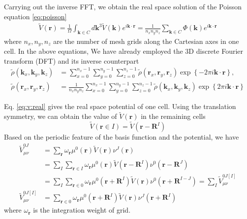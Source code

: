 \documentclass{article}
\begin{document}
Carrying out the inverse FFT, we obtain the real space solution of the Poisson
equation \eqref{eq:poisson}
\begin{align}
  \tilde{V}(\mathbf{r})
  =\frac{1}{\Omega}\int_{\mathbf{k}\in C} d\mathbf{k}^3
  \tilde{V}(\mathbf{k}) e^{i\mathbf{k}\cdot\mathbf{r}}
  =\frac{1}{n_xn_yn_z}\sum_{\mathbf{k}\in C}
  \Phi(\mathbf{k}) e^{i\mathbf{k}\cdot \mathbf{r}}
  \label{eq:v:real}
\end{align}
where $n_x,n_y,n_z$ are the number of mesh grids along the Cartesian axes in
one cell.
In the above equations, We have already employed the 3D discrete Fourier
transform (DFT) and its inverse counterpart 
\begin{align}
  \tilde{\rho}(\mathbf{k}_x,\mathbf{k}_y,\mathbf{k}_z)
  &=\sum_{x=0}^{n_x-1} \sum_{y=0}^{n_y-1} \sum_{z=0}^{n_z-1}
  \tilde{\rho}(\mathbf{r}_x,\mathbf{r}_y,\mathbf{r}_z)
  \exp\left\{-2\pi i \mathbf{k}\cdot\mathbf{r}\right\},
  \\
  \tilde{\rho}(\mathbf{r}_x,\mathbf{r}_y,\mathbf{r}_z)
  &=\frac{1}{n_xn_yn_z}\sum_{x=0}^{n_x-1}
  \sum_{y=0}^{n_y-1} \sum_{z=0}^{n_z-1}
  \tilde{\rho}(\mathbf{k}_x,\mathbf{k}_y,\mathbf{k}_z)
  \exp\left\{2\pi i \mathbf{k}\cdot \mathbf{r}\right\}
  \label{}
\end{align}

Eq. \eqref{eq:v:real} gives the real space potential of one cell.
Using the translation symmetry, we can obtain the value of
$\tilde{V}(\mathbf{r})$ in the remaining cells
\begin{equation}
  \tilde{V}(\mathbf{r}\in I) = \tilde{V}(\mathbf{r}-\mathbf{R}^I)
  \label{}
\end{equation}
Based on the periodic feature of the basis function and the potential, we
have
\begin{align}
  \tilde{V}_{\mu\nu}^{0J}
  &=\sum_{\mathbf{r}} \omega_\mathbf{r}
  \mu^0(\mathbf{r})\tilde{V}(\mathbf{r})\nu^J(\mathbf{r})
  \\
  &=\sum_{I}\sum_{\mathbf{r}\in I} \omega_\mathbf{r} \mu^0(\mathbf{r})
  \tilde{V}(\mathbf{r} - \mathbf{R}^I)\nu^0(\mathbf{r}-\mathbf{R}^J)
  \\
  &=\sum_{I}\sum_{\mathbf{r}\in 0} \omega_\mathbf{r}
  \mu^0(\mathbf{r}+\mathbf{R}^I)
  \tilde{V}(\mathbf{r})\nu^0(\mathbf{r} + \mathbf{R}^{I-J})
  =\sum_I \tilde{V}_{\mu\nu}^{0J[I]}
  \label{eq:v:r0} \\
  \tilde{V}_{\mu\nu}^{0J[I]}
  &=\sum_{\mathbf{r}\in 0} \omega_\mathbf{r} \mu^0(\mathbf{r}+\mathbf{R}^I)
  \tilde{V}(\mathbf{r})\nu^J(\mathbf{r} + \mathbf{R}^{I})
\end{align}
where $\omega_\mathbf{r}$ is the integration weight of grid.
\end{document}
